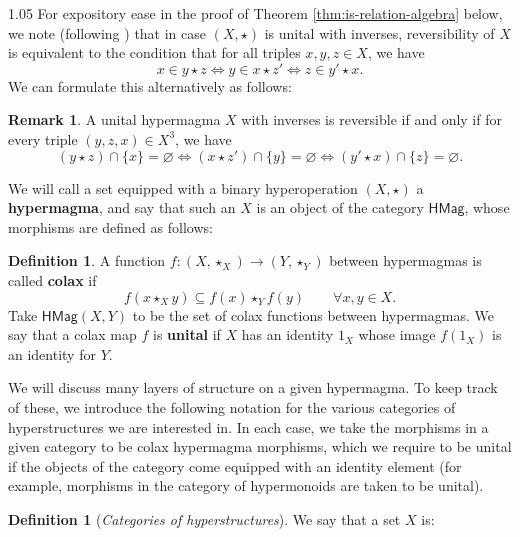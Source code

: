 \documentclass[reqno]{amsart}
\newcommand{\cat}{\mathsf}
\numberwithin{equation}{section}
\theoremstyle{plain}
\theoremstyle{definition}
\newtheorem{definition}[equation]{Definition}
\newtheorem{remark}[equation]{Remark}
\begin{document}
\begin{spacing}{1.05}
For expository ease in the proof of Theorem \ref{thm:is-relation-algebra} below, we note (following \cite{mosaics}) that in case $(X, \star)$ is unital with inverses, reversibility of $X$ is equivalent to the condition that for all triples $x,y,z \in X$, we have \begin{equation*} 
    x \in y \star z \iff y \in x \star z' \iff z \in y' \star x.
\end{equation*} We can formulate this alternatively as follows:

\begin{remark} \label{rem:charfns}
    A unital hypermagma $X$ with inverses is reversible if and only if for every triple $(y,z,x) \in X^3$, we have \begin{equation*}
    (y \star z) \cap \{x\} = \varnothing \iff ( x \star z')\cap \{y\} = \varnothing \iff (y' \star x) \cap \{z\} = \varnothing.
\end{equation*} 
\end{remark}

We will call a set equipped with a binary hyperoperation $(X,\star)$ a \textbf{hypermagma}, and say that such an $X$ is an object of the category $\cat{HMag}$, whose morphisms are defined as follows: 

\begin{definition} \label{def:colaxity-unitality}
    A function $f : (X,\star_X) \to (Y,\star_Y)$ between hypermagmas is called \textbf{colax} if $$ f(x \star_X y) \subseteq f(x) \star_Y f(y) \qquad \forall x,y \in X. $$ Take $\cat{HMag}(X,Y)$ to be the set of colax functions between hypermagmas. We say that a colax map $f$ is \textbf{unital} if $X$ has an identity $1_X$ whose image $f(1_X)$ is an identity for $Y$. 
\end{definition}

We will discuss many layers of structure on a given hypermagma. To keep track of these, we introduce the following notation for the various categories of hyperstructures we are interested in. In each case, we take the morphisms in a given category to be colax hypermagma morphisms, which we require to be unital if the objects of the category come equipped with an identity element (for example, morphisms in the category of hypermonoids are taken to be unital).

\begin{definition}[\textit{Categories of hyperstructures}] \label{def:gloss-hyper} We say that a set $X$ is:

\begin{itemize}


\end{itemize}
\end{definition}
\end{spacing}
\end{document}
